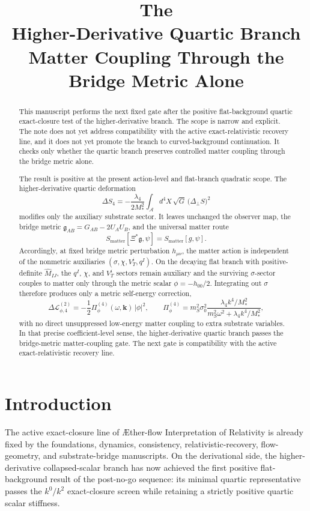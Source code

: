 \documentclass[11pt]{article}
\title{\textbf{The \TheoryName{}}\\[0.4em]
\large Higher-Derivative Quartic Branch Matter Coupling Through the Bridge Metric Alone}
\author{}
\date{}
\newcommand{\Aflow}{\AE{}ther-flow}
\newcommand{\TheoryName}{\Aflow{} Interpretation of Relativity}
\newcommand{\Sub}{\mathcal{A}}
\newcommand{\BridgeMetric}{\mathfrak{g}}
\begin{document}
\maketitle

\begin{abstract}
This manuscript performs the next fixed gate after the positive flat-background quartic exact-closure test of the higher-derivative branch. The scope is narrow and explicit. The note does not yet address compatibility with the active exact-relativistic recovery line, and it does not yet promote the branch to curved-background continuation. It checks only whether the quartic branch preserves controlled matter coupling through the bridge metric alone.

The result is positive at the present action-level and flat-branch quadratic scope. The higher-derivative quartic deformation
\[
\Delta S_4
=
-\frac{\lambda_4}{2M_*^2}
\int_{\Sub} d^4X\,\sqrt{G}\,
\bigl(\Delta_{\perp}S\bigr)^2
\]
modifies only the auxiliary substrate sector. It leaves unchanged the observer map, the bridge metric
\(\BridgeMetric_{AB}=G_{AB}-2U_AU_B\), and the universal matter route
\[
S_{\mathrm{matter}}[\Xi^*\BridgeMetric,\psi]
=
S_{\mathrm{matter}}[g,\psi].
\]
Accordingly, at fixed bridge metric perturbation \(h_{\mu\nu}\), the matter action is independent of the nonmetric auxiliaries \((\sigma,\chi,V_T^i,q^I)\). On the decaying flat branch with positive-definite \(\widehat M_{IJ}\), the \(q^I\), \(\chi\), and \(V_T^i\) sectors remain auxiliary and the surviving \(\sigma\)-sector couples to matter only through the metric scalar \(\phi=-h_{00}/2\). Integrating out \(\sigma\) therefore produces only a metric self-energy correction,
\[
\Delta\mathcal L_{\phi,4}^{(2)}
=
-\frac{1}{2}\Pi_\phi^{(4)}(\omega,\mathbf{k})\,|\phi|^2,
\qquad
\Pi_\phi^{(4)}
=
m_S^2\sigma_0^2
\frac{\lambda_4 k^4/M_*^2}
{m_S^2\omega^2+\lambda_4 k^4/M_*^2},
\]
with no direct unsuppressed low-energy matter coupling to extra substrate variables. In that precise coefficient-level sense, the higher-derivative quartic branch passes the bridge-metric matter-coupling gate. The next gate is compatibility with the active exact-relativistic recovery line.
\end{abstract}

\section{Introduction}

The active exact-closure line of \TheoryName{} is already fixed by the foundations, dynamics, consistency, relativistic-recovery, flow-geometry, and substrate-bridge manuscripts. On the derivational side, the higher-derivative collapsed-scalar branch has now achieved the first positive flat-background result of the post-no-go sequence: its minimal quartic representative passes the \(k^0/k^2\) exact-closure screen while retaining a strictly positive quartic scalar stiffness.
\end{document}
